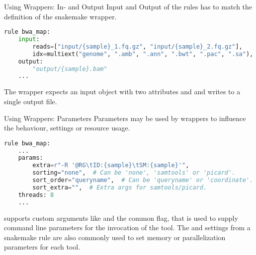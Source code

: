 \begin{frame}[fragile]{Using Wrappers: In- and Output}
    Input and Output of the rules has to match the definition of the snakemake wrapper.
    \begin{lstlisting}[language=Python,style=Python]
rule bwa_map:
    input:
        reads=["input/{sample}_1.fq.gz", "input/{sample}_2.fq.gz"],
        idx=multiext("genome", ".amb", ".ann", ".bwt", ".pac", ".sa"),
    output:
        "output/{sample}.bam"
    ...
    \end{lstlisting}
    \begin{docs}
        The  wrapper expects an input object with two attributes
         and  and writes to a single output file.
    \end{docs}
\end{frame}

\begin{frame}[fragile]{Using Wrappers: Parameters}
    Parameters may be used by wrappers to influence the behaviour, settings or resource usage.
    \begin{lstlisting}[language=Python,style=Python]
rule bwa_map:
    ...
    params:
        extra=r"-R '@RG\tID:{sample}\tSM:{sample}'",
        sorting="none",  # Can be 'none', 'samtools' or 'picard'.
        sort_order="queryname",  # Can be 'queryname' or 'coordinate'.
        sort_extra="",  # Extra args for samtools/picard.
    threads: 8
    ...
    \end{lstlisting}
    \begin{docs}
         supports custom arguments like  and
        the common  flag, that is used to supply command line parameters
        for the invocation of the tool. The  and 
        settings from a snakemake rule are also commonly used to set memory or parallelization
        parameters for each tool.
    \end{docs}
\end{frame}

